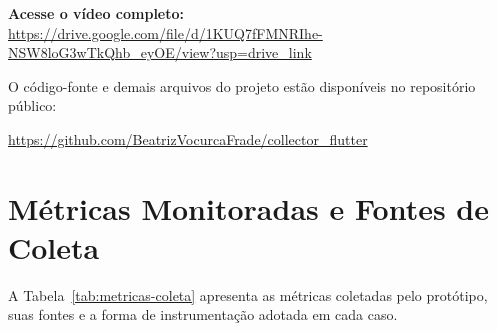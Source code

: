 \documentclass[12pt,a4paper,oneside]{abntex2}
\begin{document}
\begin{center}
  \textbf{Acesse o vídeo completo:} \\
  \url{https://drive.google.com/file/d/1KUQ7fFMNRIhe-NSW8loG3wTkQhb_eyOE/view?usp=drive_link}
\end{center}

\vspace{0.3cm}
\noindent
O código-fonte e demais arquivos do projeto estão disponíveis no repositório público:

\begin{center}
  \url{https://github.com/BeatrizVocurcaFrade/collector_flutter}
\end{center}



\section{Métricas Monitoradas e Fontes de Coleta}

A Tabela~\ref{tab:metricas-coleta} apresenta as métricas coletadas pelo protótipo, suas fontes e a forma de instrumentação adotada em cada caso.
\end{document}
